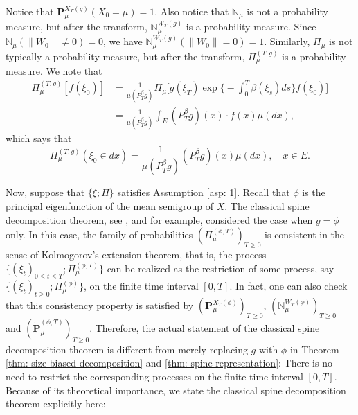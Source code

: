 \documentclass[12pt, a4paper]{amsart}
\theoremstyle{definition}
\numberwithin{equation}{section}
\begin{document}
    Notice that $\mathbf P^{X_T(g)}_\mu(X_0 = \mu) = 1$.
    Also notice that $\mathbb N_\mu$ is not a probability measure, but after the transform, $\mathbb N^{W_T(g)}_\mu$ is a probability measure.
	Since $\mathbb N_{\mu}(\|W_0\|\neq 0) = 0$, we have $\mathbb N_\mu^{W_T(g)}(\|W_0\|= 0) = 1$.
	Similarly, $\Pi_{\mu}$ is not typically a probability measure, but after the transform, $\Pi_{\mu}^{(T,g)}$ is a probability measure.
    We note that
\begin{equation}\begin{split}
	\Pi_{\mu}^{(T,g)} [ f(\xi_0) ]
	&= \frac{1}{\mu(P^\beta_Tg)}\Pi_{\mu}\Big[g(\xi_T) \exp\Big\{-\int_0^T \beta(\xi_s)ds \Big\} f(\xi_0) \Big]
	\\&= \frac{1}{\mu(P^\beta_T g)}
	\int_E (P^\beta_T g)(x) \cdot f(x)\mu(dx),
\end{split}\end{equation}
    which says that
\begin{equation}\label{eq: initial distribution of spine}
	\Pi_{\mu}^{(T,g)} (\xi_0 \in dx)
	= \frac{1}{\mu(P^\beta_T g)} (P^\beta_T g)(x)\mu(dx),
	\quad x\in E.
\end{equation}

	Now, suppose that $\{\xi; \Pi\}$ satisfies Assumption \ref{asp: 1}.
    Recall that $\phi$ is the principal eigenfunction of the mean semigroup of $X$.
	The classical spine decomposition theorem, see \cite{EckhoffKyprianouWinkel2015Spines}, \cite{EnglanderKyprianou2004Local} and \cite{LiuRenSong2009Llog} for example, considered the case when $g = \phi$ only.
	In this case, the family of probabilities $(\Pi_{\mu}^{(\phi,T)})_{T\geq 0}$ is consistent in the sense of Kolmogorov's extension theorem, that is, the process $\{(\xi_t)_{0\leq t\leq T}; \Pi_{\mu}^{(\phi,T)} \}$ can be realized as the restriction of some process, say $\{(\xi_t)_{t\geq 0}; \Pi_{\mu}^{(\phi)}\}$, 
	on the finite time interval $[0,T]$.
	In fact, one can also check that 
	this consistency property
	is satisfied by  $(\mathbf P_\mu^{X_T(\phi)} )_{T\geq 0}$, $(\mathbb N^{W_T(\phi)}_\mu)_{T\geq 0}$ and $(\dot {\mathbf P}^{(\phi,T)}_\mu)_{T\geq 0}$.
	Therefore, the actual statement of the classical spine decomposition theorem is different from merely replacing $g$ with $\phi$ in Theorem \ref{thm: size-biased decomposition} and \ref{thm: spine representation}: 
	There is no need to restrict the corresponding processes on the finite time interval $[0,T]$.
	Because of its theoretical importance, we state the classical spine decomposition theorem explicitly here:
	
\end{document}

